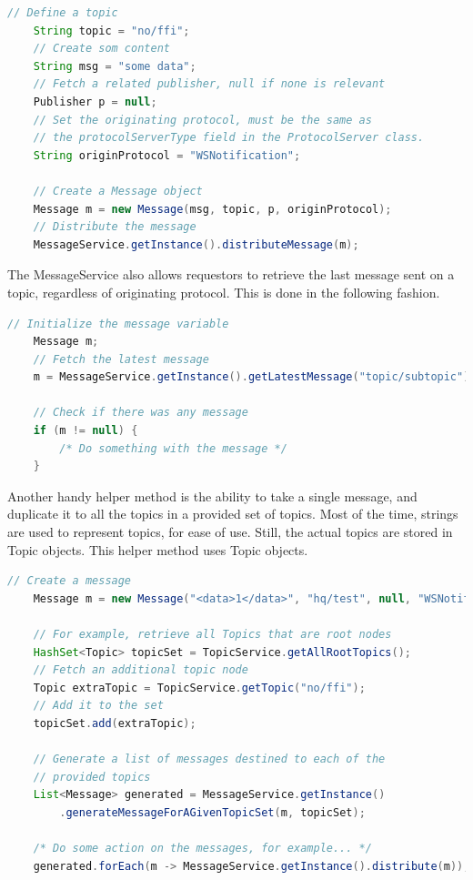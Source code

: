 \begin{lstlisting}[language=Java, captionpos=b, caption=Distributing a message, frame=bt, showstringspaces=false]
    // Define a topic
    String topic = "no/ffi";
    // Create som content
    String msg = "some data";
    // Fetch a related publisher, null if none is relevant
    Publisher p = null;
    // Set the originating protocol, must be the same as
    // the protocolServerType field in the ProtocolServer class.
    String originProtocol = "WSNotification";
    
    // Create a Message object
    Message m = new Message(msg, topic, p, originProtocol);
    // Distribute the message
    MessageService.getInstance().distributeMessage(m);
\end{lstlisting}

The MessageService also allows requestors to retrieve the last message sent on a topic, regardless of originating protocol. This is done in the following fashion.

\begin{lstlisting}[language=Java, captionpos=b, caption=Retrieving latest message on a topic, frame=bt, showstringspaces=false]
    // Initialize the message variable
    Message m;
    // Fetch the latest message
    m = MessageService.getInstance().getLatestMessage("topic/subtopic");
    
    // Check if there was any message
    if (m != null) {
        /* Do something with the message */
    }
\end{lstlisting}

Another handy helper method is the ability to take a single message, and duplicate it to all the topics in a provided set of topics. Most of the time, strings are used to represent topics, for ease of use. Still, the actual topics are stored in Topic objects. This helper method uses Topic objects.

\begin{lstlisting}[language=Java, captionpos=b, caption=Duplicating message to multiple topics, frame=bt, showstringspaces=false]
    // Create a message
    Message m = new Message("<data>1</data>", "hq/test", null, "WSNotification");

    // For example, retrieve all Topics that are root nodes
    HashSet<Topic> topicSet = TopicService.getAllRootTopics();
    // Fetch an additional topic node
    Topic extraTopic = TopicService.getTopic("no/ffi");
    // Add it to the set
    topicSet.add(extraTopic);
    
    // Generate a list of messages destined to each of the
    // provided topics
    List<Message> generated = MessageService.getInstance()
        .generateMessageForAGivenTopicSet(m, topicSet);
        
    /* Do some action on the messages, for example... */
    generated.forEach(m -> MessageService.getInstance().distribute(m));
\end{lstlisting}

